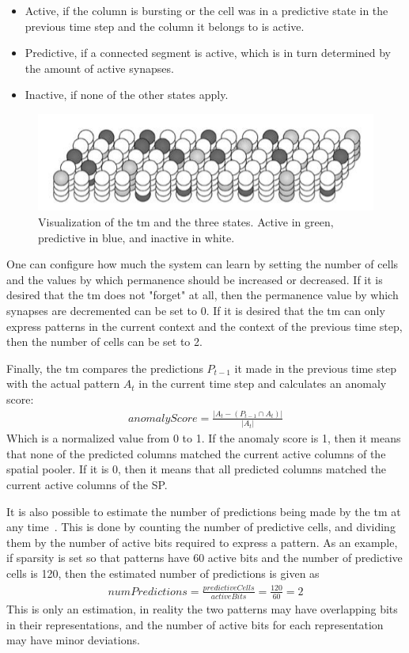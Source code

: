 \begin{itemize}
    \item Active, if the column is bursting or the cell was in a predictive state in the previous time step and the column it belongs to is active.
    \item Predictive, if a connected segment is active, which is in turn determined by the amount of active synapses.
    \item Inactive, if none of the other states apply.
\end{itemize}
\begin{figure}[H]
    \centering
    \includegraphics[width=\linewidth]{resources/related_works/tm_vis_alt}
    \caption[Visualization of Cell States]{Visualization of the \gls*{tm} and the three states. Active in green, predictive in blue, and inactive in white.}
\end{figure}

One can configure how much the system can learn by setting the number of cells and the values by which permanence should be increased or decreased. If it is desired that the \gls*{tm} does not "forget" at all, then the permanence value by which synapses are decremented can be set to 0. If it is desired that the \gls*{tm} can only express patterns in the current context and the context of the previous time step, then the number of cells can be set to 2.
\par
Finally, the \gls*{tm} compares the predictions $P_{t-1}$ it made in the previous time step with the actual pattern $A_t$ in the current time step and calculates an anomaly score:
\begin{align*}
    anomalyScore=\frac{|A_t-(P_{t-1}\cap A_t)|}{|A_t|}
\end{align*}
Which is a normalized value from 0 to 1. If the anomaly score is 1, then it means that none of the predicted columns matched the current active columns of the spatial pooler. If it is 0, then it means that all predicted columns matched the current active columns of the SP.\par
It is also possible to estimate the number of predictions being made by the \gls*{tm} at any time~\cite{htm_predictions_count}. This is done by counting the number of predictive cells, and dividing them by the number of active bits required to express a pattern. As an example, if sparsity is set so that patterns have 60 active bits and the number of predictive cells is 120, then the estimated number of predictions is given as
\begin{align*}
    numPredictions=\frac{predictiveCells}{activeBits}=\frac{120}{60}=2
\end{align*}
This is only an estimation, in reality the two patterns may have overlapping bits in their representations, and the number of active bits for each representation may have minor deviations.
